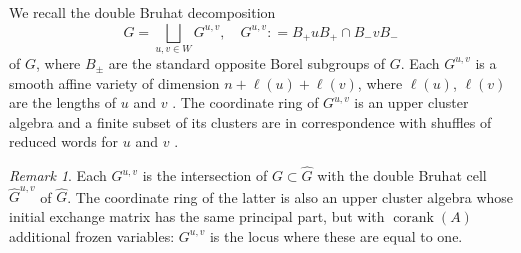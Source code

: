 \documentclass[12pt]{amsart}
\DeclareMathOperator{\corank}{corank}
\theoremstyle{remark}
\newtheorem{remark}[theorem]{Remark}
\numberwithin{equation}{section}
\numberwithin{figure}{section}
\begin{document}
We recall the double Bruhat decomposition
\[
  G = \bigsqcup_{u,v \in W} G^{u,v},\quad G^{u,v} : = B_+ u B_+ \cap B_- v B_-
\]
of $G$, where $B_{\pm}$ are the standard opposite Borel subgroups of $G$.
Each $G^{u,v}$ is a smooth affine variety of dimension $n + \ell(u) + \ell(v)$, where $\ell(u)$, $\ell(v)$ are the lengths of $u$ and $v$ \cite{FZ99,Wil13}.
The coordinate ring of $G^{u,v}$ is an upper cluster algebra and a finite subset of its clusters are in correspondence with shuffles of reduced words for $u$ and $v$ \cite{BFZ05,Wil13}.

\begin{remark}
  Each $G^{u,v}$ is the intersection of $G \subset \widehat{G}$ with the double Bruhat cell $\widehat{G}^{u,v}$ of $\widehat{G}$.
  The coordinate ring of the latter is also an upper cluster algebra whose initial exchange matrix has the same principal part, but with $\corank(A)$ additional frozen variables: $G^{u,v}$ is the locus where these are equal to one.
\end{remark}
\end{document}
